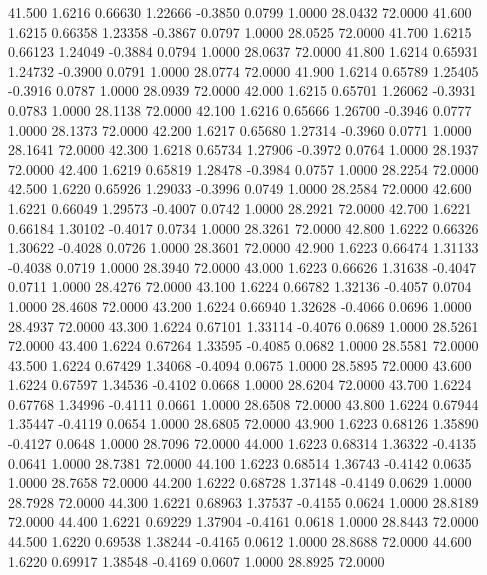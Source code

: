   41.500   1.6216   0.66630   1.22666  -0.3850   0.0799   1.0000  28.0432  72.0000
  41.600   1.6215   0.66358   1.23358  -0.3867   0.0797   1.0000  28.0525  72.0000
  41.700   1.6215   0.66123   1.24049  -0.3884   0.0794   1.0000  28.0637  72.0000
  41.800   1.6214   0.65931   1.24732  -0.3900   0.0791   1.0000  28.0774  72.0000
  41.900   1.6214   0.65789   1.25405  -0.3916   0.0787   1.0000  28.0939  72.0000
  42.000   1.6215   0.65701   1.26062  -0.3931   0.0783   1.0000  28.1138  72.0000
  42.100   1.6216   0.65666   1.26700  -0.3946   0.0777   1.0000  28.1373  72.0000
  42.200   1.6217   0.65680   1.27314  -0.3960   0.0771   1.0000  28.1641  72.0000
  42.300   1.6218   0.65734   1.27906  -0.3972   0.0764   1.0000  28.1937  72.0000
  42.400   1.6219   0.65819   1.28478  -0.3984   0.0757   1.0000  28.2254  72.0000
  42.500   1.6220   0.65926   1.29033  -0.3996   0.0749   1.0000  28.2584  72.0000
  42.600   1.6221   0.66049   1.29573  -0.4007   0.0742   1.0000  28.2921  72.0000
  42.700   1.6221   0.66184   1.30102  -0.4017   0.0734   1.0000  28.3261  72.0000
  42.800   1.6222   0.66326   1.30622  -0.4028   0.0726   1.0000  28.3601  72.0000
  42.900   1.6223   0.66474   1.31133  -0.4038   0.0719   1.0000  28.3940  72.0000
  43.000   1.6223   0.66626   1.31638  -0.4047   0.0711   1.0000  28.4276  72.0000
  43.100   1.6224   0.66782   1.32136  -0.4057   0.0704   1.0000  28.4608  72.0000
  43.200   1.6224   0.66940   1.32628  -0.4066   0.0696   1.0000  28.4937  72.0000
  43.300   1.6224   0.67101   1.33114  -0.4076   0.0689   1.0000  28.5261  72.0000
  43.400   1.6224   0.67264   1.33595  -0.4085   0.0682   1.0000  28.5581  72.0000
  43.500   1.6224   0.67429   1.34068  -0.4094   0.0675   1.0000  28.5895  72.0000
  43.600   1.6224   0.67597   1.34536  -0.4102   0.0668   1.0000  28.6204  72.0000
  43.700   1.6224   0.67768   1.34996  -0.4111   0.0661   1.0000  28.6508  72.0000
  43.800   1.6224   0.67944   1.35447  -0.4119   0.0654   1.0000  28.6805  72.0000
  43.900   1.6223   0.68126   1.35890  -0.4127   0.0648   1.0000  28.7096  72.0000
  44.000   1.6223   0.68314   1.36322  -0.4135   0.0641   1.0000  28.7381  72.0000
  44.100   1.6223   0.68514   1.36743  -0.4142   0.0635   1.0000  28.7658  72.0000
  44.200   1.6222   0.68728   1.37148  -0.4149   0.0629   1.0000  28.7928  72.0000
  44.300   1.6221   0.68963   1.37537  -0.4155   0.0624   1.0000  28.8189  72.0000
  44.400   1.6221   0.69229   1.37904  -0.4161   0.0618   1.0000  28.8443  72.0000
  44.500   1.6220   0.69538   1.38244  -0.4165   0.0612   1.0000  28.8688  72.0000
  44.600   1.6220   0.69917   1.38548  -0.4169   0.0607   1.0000  28.8925  72.0000
